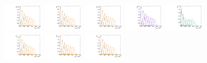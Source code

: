 \begin{figure}[htbp]
  \centering
  \includegraphics[width=0.18\textwidth]{fig/2Dfit/templateSignalVsMX_fromDC_GbuToWW_MVV_mu_HP_nobb_LDy.pdf}
  \includegraphics[width=0.18\textwidth]{fig/2Dfit/templateSignalVsMX_fromDC_RadToWW_MVV_mu_HP_nobb_LDy.pdf}
  \includegraphics[width=0.18\textwidth]{fig/2Dfit/templateSignalVsMX_fromDC_ZprToWW_MVV_mu_HP_nobb_LDy.pdf}
  \includegraphics[width=0.18\textwidth]{fig/2Dfit/templateSignalVsMX_fromDC_WprToWZ_MVV_mu_HP_nobb_LDy.pdf}
  \includegraphics[width=0.18\textwidth]{fig/2Dfit/templateSignalVsMX_fromDC_WprToWH_MVV_mu_HP_nobb_LDy.pdf}\\
  \includegraphics[width=0.18\textwidth]{fig/2Dfit/templateSignalVsMX_fromDC_GbuToWW_MVV_mu_LP_nobb_LDy.pdf}
  \includegraphics[width=0.18\textwidth]{fig/2Dfit/templateSignalVsMX_fromDC_RadToWW_MVV_mu_LP_nobb_LDy.pdf}
  \includegraphics[width=0.18\textwidth]{fig/2Dfit/templateSignalVsMX_fromDC_ZprToWW_MVV_mu_LP_nobb_LDy.pdf}

\end{figure}
